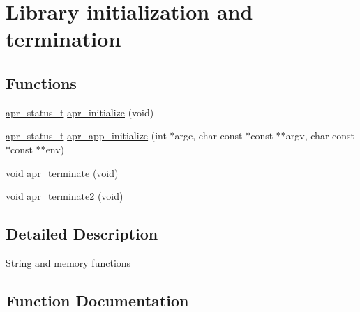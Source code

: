 \hypertarget{group__apr__library}{}\section{Library initialization and termination}
\label{group__apr__library}
\subsection*{Functions}
\begin{DoxyCompactItemize}
\item 
\hyperlink{group__apr__errno_gaf76ee4543247e9fb3f3546203e590a6c}{apr\+\_\+status\+\_\+t} \hyperlink{group__apr__library_ga4a91a6b9ff457ead13e670950127761a}{apr\+\_\+initialize} (void)
\item 
\hyperlink{group__apr__errno_gaf76ee4543247e9fb3f3546203e590a6c}{apr\+\_\+status\+\_\+t} \hyperlink{group__apr__library_gaa1c4fc2e1c814cc5d4cd3d8719288fc9}{apr\+\_\+app\+\_\+initialize} (int $\ast$argc, char const $\ast$const $\ast$$\ast$argv, char const $\ast$const $\ast$$\ast$env)
\item 
void \hyperlink{group__apr__library_ga8e96d45ee09fc7e7eb3646efef1424a3}{apr\+\_\+terminate} (void)
\item 
void \hyperlink{group__apr__library_ga18667a60ff34d6209e519b4a4ce8cad1}{apr\+\_\+terminate2} (void)
\end{DoxyCompactItemize}


\subsection{Detailed Description}
String and memory functions 

\subsection{Function Documentation}
